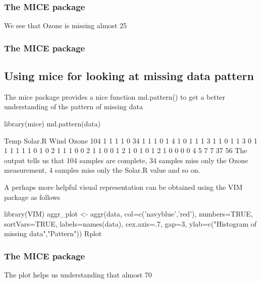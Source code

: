 \begin{frame}[fragile]
	\frametitle{The MICE package}
	\Large
We see that Ozone is missing almost 25%
\end{frame}
\begin{frame}[fragile]
	\frametitle{The MICE package}
	\Large
\subsection{Using mice for looking at missing data pattern}
The mice package provides a nice function md.pattern() to get a better understanding of the pattern of missing data

library(mice)
md.pattern(data)

    Temp Solar.R Wind Ozone   
104    1       1    1     1  0
 34    1       1    1     0  1
  4    1       0    1     1  1
  3    1       1    0     1  1
  3    0       1    1     1  1
  1    1       0    1     0  2
  1    1       1    0     0  2
  1    1       0    0     1  2
  1    0       1    0     1  2
  1    0       0    0     0  4
       5       7    7    37 56
The output tells us that 104 samples are complete, 34 samples miss only the Ozone measurement, 4 samples miss only the Solar.R value and so on.


\end{frame}
\begin{frame}
A perhaps more helpful visual representation can be obtained using the VIM package as follows

library(VIM)
aggr_plot <- aggr(data, col=c('navyblue','red'), numbers=TRUE, sortVars=TRUE, labels=names(data), cex.axis=.7, gap=3, ylab=c("Histogram of missing data","Pattern"))
Rplot


\end{frame}
\begin{frame}[fragile]
	\frametitle{The MICE package}
	\Large
The plot helps us understanding that almost 70%

\end{frame}
